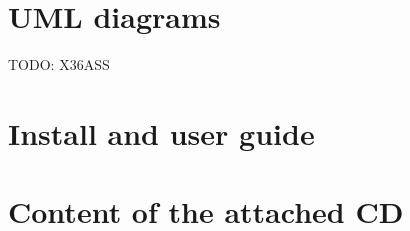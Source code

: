 \documentclass[11pt,twoside,a4paper]{book}
\begin{document}

\chapter{UML diagrams}

TODO: X36ASS



\chapter{Install and user guide}



\chapter{Content of the attached CD}
\end{document}
